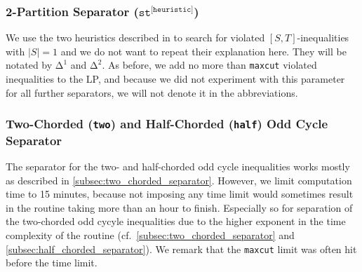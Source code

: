 \subsubsection{2-Partition Separator (\texorpdfstring{$\texttt{st}^{\texttt{[heuristic]}}$}{Δ})}
We use the two heuristics described in \cite{grotschelCuttingPlaneAlgorithm1989} to search for violated $\left[ S,T \right]$-inequalities with $\lvert S \rvert = 1$ and we do not want to repeat their explanation here.
They will be notated by $\texttt{Δ}^{1}$ and $\texttt{Δ}^{2}$.
As before, we add no more than \texttt{maxcut} violated inequalities to the LP, and because we did not experiment with this parameter for all further separators, we will not denote it in the abbreviations.

\subsubsection{Two-Chorded (\texttt{two}) and Half-Chorded (\texttt{half}) Odd Cycle Separator}
The separator for the two- and half-chorded odd cycle inequalities works mostly as described in \cref{subsec:two_chorded_separator}.
However, we limit computation time to 15 minutes, because not imposing any time limit would sometimes result in the routine taking more than an hour to finish.
Especially so for separation of the two-chorded odd cycyle inequalities due to the higher exponent in the time complexity of the routine (cf.\ \cref{subsec:two_chorded_separator} and \cref{subsec:half_chorded_separator}).
We remark that the \texttt{maxcut} limit was often hit before the time limit.

